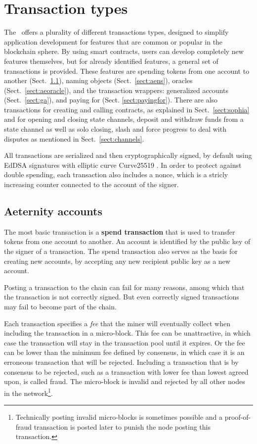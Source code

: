 \section{Transaction types}
\label{sect:transactions}

The \blockchain\ offers a plurality of different transactions
types, designed to simplify application development for features that are
common or popular in the blockchain sphere. By using smart contracts,
users can develop completely new features themselves, but for already
identified features, a general set of transactions is
provided. These features are spending tokens from one account to
another (Sect.\ \ref{sect:aespend}), naming objects (Sect.\
\ref{sect:aens}), oracles (Sect.\ \ref{sect:aeoracle}), and the
transaction wrappers: generalized
accounts (Sect.\ \ref{sect:ga}), and paying for
(Sect. \ref{sect:payingfor}).
There are also transactions for creating and calling contracts, as
explained in Sect.\ \ref{sect:sophia} and for opening and closing
state channels, deposit and withdraw funds from a state channel as
well as solo closing, slash and force progress to deal with
disputes as mentioned in Sect.\ \ref{sect:channels}.

All transactions are serialized and then cryptographically signed, by default using EdDSA \cite{bernstein2012high}
signatures with elliptic curve Curve25519
\cite{bernstein2006curve25519}. In order to protect against double
spending, each transaction also includes a nonce, which is a stricly
increasing counter connected to the account of the signer.

\subsection{Aeternity accounts}
\label{sect:aespend}

The most basic transaction is a \textbf{spend
transaction} that is used to transfer tokens from one account to
another. An account is identified by the public key of the signer of
a transaction. The spend transaction also serves as the basis for
creating new accounts, by accepting any new recipient public key as a new
account.

Posting a transaction to the chain can fail for many reasons, among
which that the transaction is not correctly signed. But even correctly
signed transactions may fail to become part of the chain.

Each transaction specifies a \textit{fee} that the miner will
     eventually collect when including the transaction in a
     micro-block. This fee can be unattractive, in which case the
     transaction will stay in the transaction pool until it
     expires. Or the fee can be lower than the minimum fee defined by
     consensus, in which case it is an erroneous transaction that
     will be rejected. Including a transaction that is by consensus to be rejected,  such as a
     transaction with lower fee than lowest agreed upon, is called
     fraud. The micro-block is invalid and rejected by
     all other nodes in the network\footnote{Technically posting
       invalid micro-blocks is sometimes possible and a proof-of-fraud
       transaction is posted later to punish the node posting this transaction.}.

